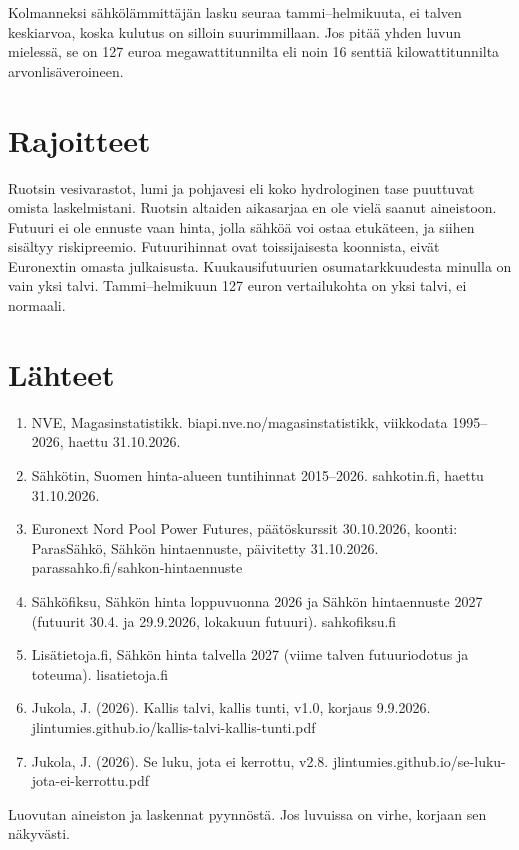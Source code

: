 \documentclass[11pt,a4paper]{article}
\begin{document}
Kolmanneksi sähkölämmittäjän lasku seuraa tammi–helmikuuta, ei talven keskiarvoa, koska kulutus on silloin suurimmillaan. Jos pitää yhden luvun mielessä, se on 127 euroa megawattitunnilta eli noin 16 senttiä kilowattitunnilta arvonlisäveroineen.

\section{Rajoitteet}

Ruotsin vesivarastot, lumi ja pohjavesi eli koko hydrologinen tase puuttuvat omista laskelmistani. Ruotsin altaiden aikasarjaa en ole vielä saanut aineistoon. Futuuri ei ole ennuste vaan hinta, jolla sähköä voi ostaa etukäteen, ja siihen sisältyy riskipreemio. Futuurihinnat ovat toissijaisesta koonnista, eivät Euronextin omasta julkaisusta. Kuukausifutuurien osumatarkkuudesta minulla on vain yksi talvi. Tammi–helmikuun 127 euron vertailukohta on yksi talvi, ei normaali.

\section*{Lähteet}
{\small
\begin{enumerate}\setlength{\itemsep}{1pt}
\item NVE, Magasinstatistikk. biapi.nve.no/magasinstatistikk, viikkodata 1995–2026, haettu 31.10.2026.
\item Sähkötin, Suomen hinta-alueen tuntihinnat 2015–2026. sahkotin.fi, haettu 31.10.2026.
\item Euronext Nord Pool Power Futures, päätöskurssit 30.10.2026, koonti: ParasSähkö, Sähkön hintaennuste, päivitetty 31.10.2026. parassahko.fi/sahkon-hintaennuste
\item Sähköfiksu, Sähkön hinta loppuvuonna 2026 ja Sähkön hintaennuste 2027 (futuurit 30.4. ja 29.9.2026, lokakuun futuuri). sahkofiksu.fi
\item Lisätietoja.fi, Sähkön hinta talvella 2027 (viime talven futuuriodotus ja toteuma). lisatietoja.fi
\item Jukola, J. (2026). Kallis talvi, kallis tunti, v1.0, korjaus 9.9.2026. jlintumies.github.io/kallis-talvi-kallis-tunti.pdf
\item Jukola, J. (2026). Se luku, jota ei kerrottu, v2.8. jlintumies.github.io/se-luku-jota-ei-kerrottu.pdf
\end{enumerate}
}

Luovutan aineiston ja laskennat pyynnöstä. Jos luvuissa on virhe, korjaan sen näkyvästi.
\end{document}
